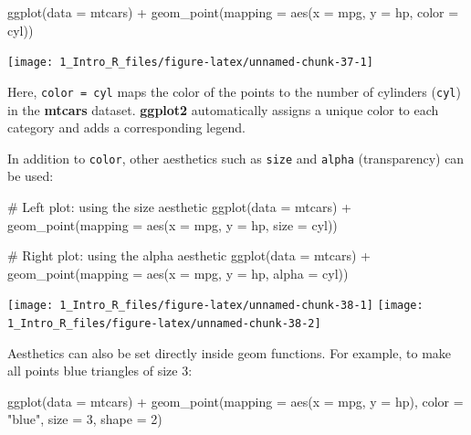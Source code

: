 \documentclass[
  11pt,
]{book}
\makeatletter
\newenvironment{Shaded}{}{}
\newcommand{\AttributeTok}[1]{#1}
\newcommand{\CommentTok}[1]{\textcolor[rgb]{0.36,0.36,0.36}{#1}}
\newcommand{\DecValTok}[1]{#1}
\newcommand{\FunctionTok}[1]{#1}
\newcommand{\NormalTok}[1]{#1}
\newcommand{\SpecialCharTok}[1]{\textcolor[rgb]{0.39,0.39,0.39}{#1}}
\newcommand{\StringTok}[1]{\textcolor[rgb]{0.39,0.39,0.39}{#1}}
\newenvironment{kframe}{%
\medskip{}
\setlength{\fboxsep}{.8em}
 \def\at@end@of@kframe{}%
 \ifinner\ifhmode%
  \def\at@end@of@kframe{\end{minipage}}%
  \begin{minipage}{\columnwidth}%
 \fi\fi%
 \def\FrameCommand##1{\hskip\@totalleftmargin \hskip-\fboxsep
 \colorbox{shadecolor}{##1}\hskip-\fboxsep
     \hskip-\linewidth \hskip-\@totalleftmargin \hskip\columnwidth}%
 \MakeFramed {\advance\hsize-\width
   \@totalleftmargin\z@ \linewidth\hsize
   \@setminipage}}%
 {\par\unskip\endMakeFramed%
 \at@end@of@kframe}
\renewenvironment{Shaded}{\begin{kframe}}{\end{kframe}}
\theoremstyle{definition}
\theoremstyle{definition}
\theoremstyle{definition}
\theoremstyle{definition}
\theoremstyle{remark}
\makeatother
\begin{document}
\begin{Shaded}
\begin{Highlighting}[]
\FunctionTok{ggplot}\NormalTok{(}\AttributeTok{data =}\NormalTok{ mtcars) }\SpecialCharTok{+}
  \FunctionTok{geom\_point}\NormalTok{(}\AttributeTok{mapping =} \FunctionTok{aes}\NormalTok{(}\AttributeTok{x =}\NormalTok{ mpg, }\AttributeTok{y =}\NormalTok{ hp, }\AttributeTok{color =}\NormalTok{ cyl))}
\end{Highlighting}
\end{Shaded}

\begin{center}\texttt{[image: 1\_Intro\_R\_files/figure-latex/unnamed-chunk-37-1]} \end{center}

Here, \texttt{color\ =\ cyl} maps the color of the points to the number of cylinders (\texttt{cyl}) in the \textbf{mtcars} dataset. \textbf{ggplot2} automatically assigns a unique color to each category and adds a corresponding legend.

In addition to \texttt{color}, other aesthetics such as \texttt{size} and \texttt{alpha} (transparency) can be used:

\begin{Shaded}
\begin{Highlighting}[]
\CommentTok{\# Left plot: using the size aesthetic}
\FunctionTok{ggplot}\NormalTok{(}\AttributeTok{data =}\NormalTok{ mtcars) }\SpecialCharTok{+}
  \FunctionTok{geom\_point}\NormalTok{(}\AttributeTok{mapping =} \FunctionTok{aes}\NormalTok{(}\AttributeTok{x =}\NormalTok{ mpg, }\AttributeTok{y =}\NormalTok{ hp, }\AttributeTok{size =}\NormalTok{ cyl))}

\CommentTok{\# Right plot: using the alpha aesthetic}
\FunctionTok{ggplot}\NormalTok{(}\AttributeTok{data =}\NormalTok{ mtcars) }\SpecialCharTok{+}
  \FunctionTok{geom\_point}\NormalTok{(}\AttributeTok{mapping =} \FunctionTok{aes}\NormalTok{(}\AttributeTok{x =}\NormalTok{ mpg, }\AttributeTok{y =}\NormalTok{ hp, }\AttributeTok{alpha =}\NormalTok{ cyl))}
\end{Highlighting}
\end{Shaded}

\texttt{[image: 1\_Intro\_R\_files/figure-latex/unnamed-chunk-38-1]} \texttt{[image: 1\_Intro\_R\_files/figure-latex/unnamed-chunk-38-2]}

Aesthetics can also be set directly inside geom functions. For example, to make all points blue triangles of size 3:

\begin{Shaded}
\begin{Highlighting}[]
\FunctionTok{ggplot}\NormalTok{(}\AttributeTok{data =}\NormalTok{ mtcars) }\SpecialCharTok{+}
  \FunctionTok{geom\_point}\NormalTok{(}\AttributeTok{mapping =} \FunctionTok{aes}\NormalTok{(}\AttributeTok{x =}\NormalTok{ mpg, }\AttributeTok{y =}\NormalTok{ hp), }
             \AttributeTok{color =} \StringTok{"blue"}\NormalTok{, }\AttributeTok{size =} \DecValTok{3}\NormalTok{, }\AttributeTok{shape =} \DecValTok{2}\NormalTok{)}
\end{Highlighting}
\end{Shaded}
\end{document}
